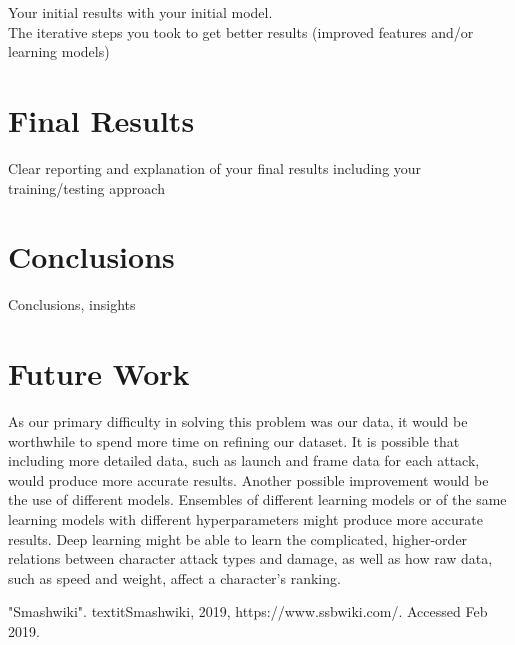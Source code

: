 \documentclass{article}
\begin{document}
Your initial results with your initial model.\\
The iterative steps you took to get better results (improved features and/or learning models)

\section{Final Results}

Clear reporting and explanation of your final results including your training/testing approach

\section{Conclusions}

Conclusions, insights

\section{Future Work}

As our primary difficulty in solving this problem was our data, it would be worthwhile to spend more time on refining our dataset.
It is possible that including more detailed data, such as launch and frame data for each attack, would produce more accurate results.
Another possible improvement would be the use of different models.
Ensembles of different learning models or of the same learning models with different hyperparameters might produce more accurate results.
Deep learning might be able to learn the complicated, higher-order relations between character attack types and damage, as well as how raw data,
such as speed and weight, affect a character's ranking.

\appendix

\begin{thebibliography}{1}
"Smashwiki". textit{Smashwiki}, 2019, https://www.ssbwiki.com/. Accessed Feb 2019.
\end{thebibliography}
\end{document}
